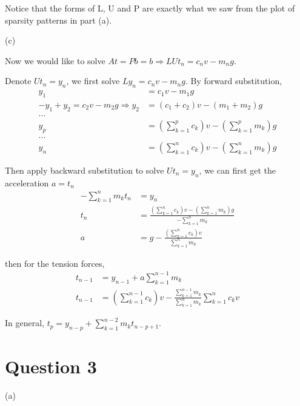 \documentclass[12pt]{article}
\begin{document}
Notice that the forms of L, U and P are exactly what we saw from the plot of sparsity patterns in part (a).

(c)

Now we would like to solve $At = Pb = b \Rightarrow LUt_n = c_n v-m_n g$.

Denote $Ut_n = y_n$, we first solve $Ly_n = c_n v-m_n g$. By forward substitution, 
\begin{equation}
\begin{aligned}
y_1 &= c_1 v - m_1 g\\
-y_1 + y_2 = c_2 v - m_2 g \Rightarrow y_2 &= (c_1+c_2)v-(m_1+m_2)g\\
...\\
y_p &= (\sum_{k = 1}^p c_k)v - (\sum_{k = 1}^p m_k)g\\
...\\
y_n &= (\sum_{k = 1}^n c_k)v - (\sum_{k = 1}^n m_k)g
\nonumber
\end{aligned}
\end{equation}

Then apply backward substitution to solve $Ut_n = y_n$, we can first get the acceleration $a = t_n$
\begin{equation}
\begin{aligned}
-\sum_{k = 1}^n m_k t_n &= y_n\\
t_n &= \frac{(\sum_{k = 1}^n c_k)v - (\sum_{k = 1}^n m_k)g}{-\sum_{k = 1}^n m_k}\\
a &= g - \frac{(\sum_{k = 1}^n c_k)v}{\sum_{k = 1}^n m_k}
\nonumber
\end{aligned}
\end{equation}

then for the tension forces,
\begin{equation}
\begin{aligned}
t_{n-1} &= y_{n-1}+ a\sum_{k = 1}^{n-1}m_k \\
t_{n-1} &= (\sum_{k = 1}^{n-1}c_k) v-\frac{\sum_{k = 1}^{n-1}m_k}{\sum_{k = 1}^{n}m_k}\sum_{k = 1}^{n}c_k v
\nonumber
\end{aligned}
\end{equation}

In general, $t_p = y_{n-p} + \sum_{k=1}^{n-2}m_k t_{n-p+1}$.

\section{Question 3}

(a)
\end{document}

